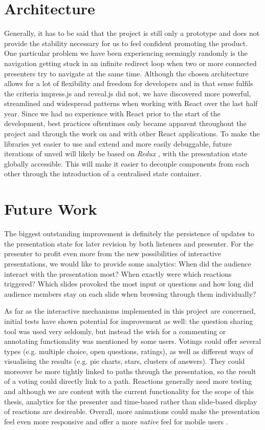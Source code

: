 \section{Architecture}
Generally, it has to be said that the project is still only a prototype and does not provide the stability necessary for us to feel confident promoting the product. One particular problem we have been experiencing seemingly randomly is the navigation getting stuck in an infinite redirect loop when two or more connected presenters try to navigate at the same time. 
Although the chosen architecture allows for a lot of flexibility and freedom for developers and in that sense fulfils the criteria impress.js and reveal.js did not, we have discovered more powerful, streamlined and widespread patterns when working with React over the last half year. Since we had no experience with React prior to the start of the development, best practices oftentimes only became apparent throughout the project and through the work on and with other React applications. To make the libraries yet easier to use and extend and more easily debuggable, future iterations of unveil will likely be based on \emph{Redux} \cite{redux}, with the presentation state globally accessible. This will make it easier to decouple components from each other through the introduction of a centralised state container.

\section{Future Work}
The biggest outstanding improvement is definitely the persistence of updates to the presentation state for later revision by both listeners and presenter. For the presenter to profit even more from the new possibilities of interactive presentations, we would like to provide some analytics: When did the audience interact with the presentation most? When exactly were which reactions triggered? Which slides provoked the most input or questions and how long did audience members stay on each slide when browsing through them individually?

As far as the interactive mechanisms implemented in this project are concerned, initial tests have shown potential for improvement as well: the question sharing tool was used very seldomly, but instead the wish for a commenting or annotating functionality was mentioned by some users. Votings could offer several types (e.g. multiple choice, open questions, ratings), as well as different ways of visualising the results (e.g. pie charts, stars, clusters of answers). They could moreover be more tightly linked to paths through the presentation, so the result of a voting could directly link to a path.
Reactions generally need more testing and although we are content with the current functionality for the scope of this thesis, analytics for the presenter and time-based rather than slide-based display of reactions are desireable.
Overall, more animations could make the presentation feel even more responsive and offer a more \emph{native} feel for mobile users \cite{GoogleMaterialDesignGuide}.

